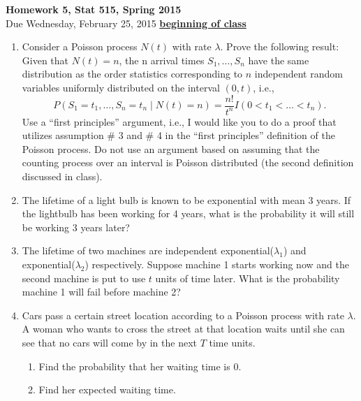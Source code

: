 \documentclass{article}
\begin{document}
\begin{center}
\Large
{\bf Homework 5, Stat 515, Spring 2015}\\
\normalsize
Due Wednesday, February 25, 2015 \underline{{\bf beginning of class}}\\
\end{center}

\begin{enumerate}%
\item Consider a Poisson process $N(t)$ with rate $\lambda$. Prove the
  following result: Given that $N(t)=n$, the n arrival times
  $S_1,\dots,S_n$ have the same distribution as the order statistics
  corresponding to $n$ independent random variables uniformly
  distributed on the interval $(0,t)$, i.e., $$P(S_1=t_1,\dots,S_n=t_n
  \mid N(t)=n)=\frac{n!}{t^n} I(0<t_1<\dots <t_n).  $$ Use a ``first
  principles'' argument, i.e., I would like you to do a proof that
  utilizes assumption \# 3 and \# 4 in the ``first principles'' definition
  of the Poisson process. Do not use an argument based on assuming
  that the counting process over an interval is Poisson distributed
  (the second definition discussed in class).
\item The lifetime of a light bulb is known to be exponential with mean 3 years. If the lightbulb has been working for 4 years, what is the probability it will still be working 3 years later? 
\item The lifetime of two machines are independent exponential($\lambda_1$) and exponential($\lambda_2$) respectively. Suppose machine 1 starts working now and the second machine is put to use $t$ units of time later. What is the probability  machine 1 will fail before machine 2? 
\item Cars pass a certain street location according to a Poisson
  process with rate $\lambda$. A woman who wants to cross the street
  at that location waits until she can see that no cars will come by
  in the next $T$ time units.
  \begin{enumerate}
  \item Find the probability that her waiting time is 0.
  \item Find her expected waiting time.
  \end{enumerate}

\end{enumerate}
\end{document}
